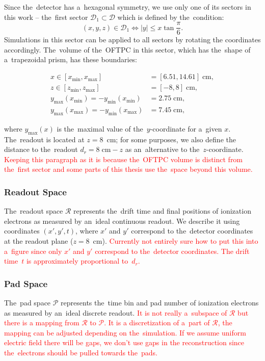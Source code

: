 		Since the~detector has a~hexagonal symmetry, we use only one of its sectors in this work -- the~first sector $\mathcal{D}_1 \subset \mathcal{D}$ which is defined by the~condition:
			\begin{equation}
				(x,y,z) \in \mathcal{D}_1 \Leftrightarrow |y| \leq x\tan \frac{\pi}{6}.
			\end{equation}
		Simulations in this sector can be applied to all sectors by rotating the coordinates accordingly. The~volume of the~\ac{OFTPC} in this sector, which has the~shape of a~trapezoidal prism, has these boundaries:
			\begin{linenomath}
				\begin{align}
					x \in [x_\text{min},x_\text{max}] &= [6.51, 14.61] \;\text{cm},\\
					z \in [z_\text{min},z_\text{max}] &= [-8,8] \;\text{cm},\\
					y_\text{max}(x_\text{min}) = -y_\text{min}(x_\text{min}) &=  2.75\;\text{cm},\\
					y_\text{max}(x_\text{max}) = -y_\text{min}(x_\text{max}) &=  7.45\;\text{cm},
				\end{align}
			\end{linenomath}
		where $y_\text{max}(x)$ is the~maximal value of the~$y$-coordinate for a~given $x$. The~readout is located at $z = 8$~cm; for some purposes, we also define the distance to the~readout $d_r = 8\;\text{cm}-z$ as an~alternative to the~$z$-coordinate. \textcolor{red}{Keeping this paragraph as it is because the~\ac{OFTPC} volume is distinct from the~first sector and some parts of this thesis use the~space beyond this volume.}
		
		\subsubsection{Readout Space}
			The~readout space $\mathcal{R}$ represents the~drift time and final positions of ionization electrons as measured by an~ideal continuous readout. We describe it using coordinates $(x',y',t)$, where $x'$ and $y'$ correspond to the~detector coordinates at the readout plane ($z = 8$~cm). \textcolor{red}{Currently not entirely sure how to put this into a~figure since only $x'$ and $y'$ correspond to the~detector coordinates. The drift time~$t$ is approximately proportional to~$d_r$.}
		
		\subsubsection{Pad Space}
			The~pad space $\mathcal{P}$ represents the~time bin and pad number of ionization electrons as measured by an~ideal discrete readout. \textcolor{red}{It is not really a~subspace of $\mathcal{R}$ but there is a mapping from $\mathcal{R}$ to $\mathcal{P}$. It is a discretization of a~part of $\mathcal{R}$, the mapping can be adjusted depending on the~simulation. If we assume uniform electric field there will be gaps, we don't use gaps in the reconstruction since the~electrons should be pulled towards the~pads.}
			
